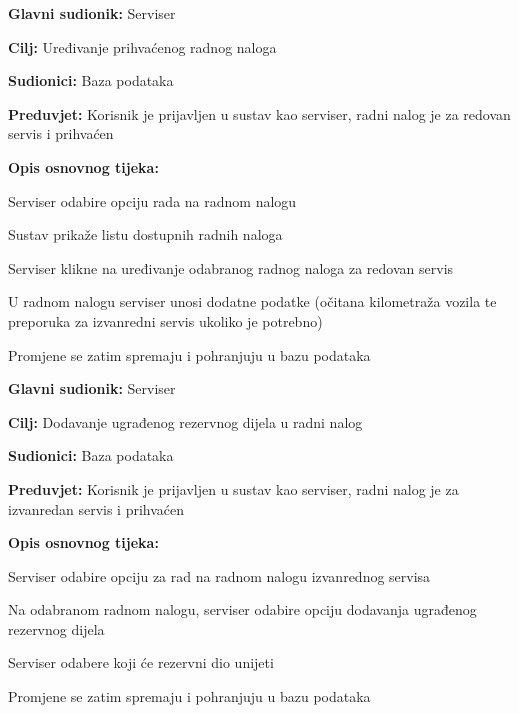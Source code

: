 \noindent {}
\begin{packed_item}
	
	\item \textbf{Glavni sudionik: } Serviser
	\item  \textbf{Cilj:} Uređivanje prihvaćenog radnog naloga
	\item  \textbf{Sudionici:} Baza podataka
	\item  \textbf{Preduvjet:} Korisnik je prijavljen u sustav kao serviser, radni nalog je
	za redovan servis i prihvaćen
	\item  \textbf{Opis osnovnog tijeka:}
	
	\item[] \begin{packed_enum}
		
		\item Serviser odabire opciju rada na radnom nalogu
		\item Sustav prikaže listu dostupnih radnih naloga
		\item Serviser klikne na uređivanje odabranog radnog naloga za redovan
		servis
		\item U radnom nalogu serviser unosi dodatne podatke (očitana kilometraža
		vozila te preporuka za izvanredni servis ukoliko je potrebno)
		\item Promjene se zatim spremaju i pohranjuju u bazu podataka
		
	\end{packed_enum}
\end{packed_item}

\noindent {}
\begin{packed_item}
	
	\item \textbf{Glavni sudionik: } Serviser
	\item  \textbf{Cilj:} Dodavanje ugrađenog rezervnog dijela u radni nalog
	\item  \textbf{Sudionici:} Baza podataka
	\item  \textbf{Preduvjet:} Korisnik je prijavljen u sustav kao serviser, radni nalog je
	za izvanredan servis i prihvaćen
	\item  \textbf{Opis osnovnog tijeka:}
	
	\item[] \begin{packed_enum}
		
		\item Serviser odabire opciju za rad na radnom nalogu izvanrednog servisa
		\item Na odabranom radnom nalogu, serviser odabire opciju dodavanja ugrađenog rezervnog dijela
		\item Serviser odabere koji će rezervni dio unijeti
		\item Promjene se zatim spremaju i pohranjuju u bazu podataka
		
	\end{packed_enum}
\end{packed_item}

